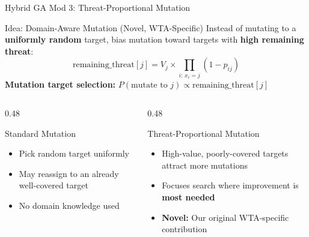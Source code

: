 \documentclass[aspectratio=169,10pt]{beamer}
\begin{document}

\begin{frame}[shrink=5]{Hybrid GA Mod 3: Threat-Proportional Mutation}

  \begin{block}{Idea: Domain-Aware Mutation (Novel, WTA-Specific)}
    \small
    Instead of mutating to a \textbf{uniformly random} target, bias mutation
    toward targets with \textbf{high remaining threat}:
    \[
      \text{remaining\_threat}[j]
        = V_j \times \prod_{i:\,x_i = j} (1 - p_{ij})
    \]
    \textbf{Mutation target selection:}\quad
    $P(\text{mutate to } j) \propto \text{remaining\_threat}[j]$
  \end{block}

  \vspace{0.15cm}

  \begin{columns}[t]
    \begin{column}{0.48\textwidth}
      \begin{exampleblock}{Standard Mutation}
        \small
        \begin{itemize}\setlength\itemsep{2pt}
          \item[\color{goldaccent}$\blacktriangleright$]
            Pick random target uniformly
          \item[\color{goldaccent}$\blacktriangleright$]
            May reassign to an already well-covered target
          \item[\color{goldaccent}$\blacktriangleright$]
            No domain knowledge used
        \end{itemize}
      \end{exampleblock}
    \end{column}
    \begin{column}{0.48\textwidth}
      \begin{alertblock}{Threat-Proportional Mutation}
        \small
        \begin{itemize}\setlength\itemsep{2pt}
          \item[\color{goldaccent}$\blacktriangleright$]
            High-value, poorly-covered targets attract more mutations
          \item[\color{goldaccent}$\blacktriangleright$]
            Focuses search where improvement is \textbf{most needed}
          \item[\color{goldaccent}$\blacktriangleright$]
            \textbf{Novel:} Our original WTA-specific contribution
        \end{itemize}
      \end{alertblock}
    \end{column}
  \end{columns}


\end{frame}
\end{document}
